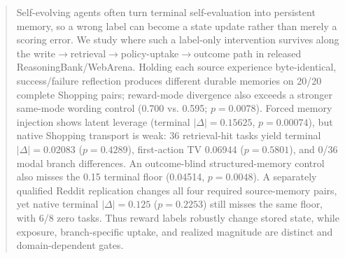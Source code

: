 \begin{abstract}
Self-evolving agents often turn terminal self-evaluation into persistent memory, so a wrong label can become a state update rather than merely a scoring error. We study where such a label-only intervention survives along the write$\rightarrow$retrieval$\rightarrow$policy-uptake$\rightarrow$outcome path in released ReasoningBank/WebArena. Holding each source experience byte-identical, success/failure reflection produces different durable memories on 20/20 complete Shopping pairs; reward-mode divergence also exceeds a stronger same-mode wording control (0.700 vs. 0.595; $p=0.0078$). Forced memory injection shows latent leverage (terminal $|\Delta|=0.15625$, $p=0.00074$), but native Shopping transport is weak: 36 retrieval-hit tasks yield terminal $|\Delta|=0.02083$ ($p=0.4289$), first-action TV 0.06944 ($p=0.5801$), and 0/36 modal branch differences. An outcome-blind structured-memory control also misses the 0.15 terminal floor (0.04514, $p=0.0048$). A separately qualified Reddit replication changes all four required source-memory pairs, yet native terminal $|\Delta|=0.125$ ($p=0.2253$) still misses the same floor, with 6/8 zero tasks. Thus reward labels robustly change stored state, while exposure, branch-specific uptake, and realized magnitude are distinct and domain-dependent gates.
\end{abstract}
